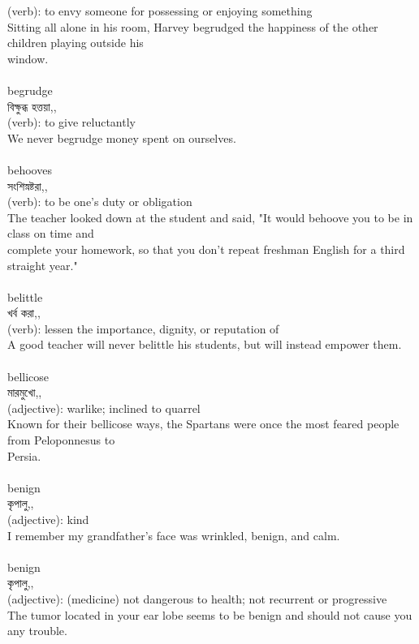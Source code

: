 \documentclass{article}
\begin{document}
{(verb): to envy someone for possessing or enjoying something\\Sitting all alone in his room, Harvey begrudged the happiness of the other children playing outside his\\window.\\}\\
{begrudge}\\
{বিক্ষুব্ধ হত্তয়া,,}\\
{(verb): to give reluctantly\\We never begrudge money spent on ourselves.\\}\\
{behooves}\\
{সংশিস্নষ্টরা,,}\\
{(verb): to be one's duty or obligation\\The teacher looked down at the student and said, "It would behoove you to be in class on time and\\complete your homework, so that you don't repeat freshman English for a third straight year."\\}\\
{belittle}\\
{খর্ব করা,,}\\
{(verb): lessen the importance, dignity, or reputation of\\A good teacher will never belittle his students, but will instead empower them.\\}\\
{bellicose}\\
{মারমুখো,,}\\
{(adjective): warlike; inclined to quarrel\\Known for their bellicose ways, the Spartans were once the most feared people from Peloponnesus to\\Persia.\\}\\
{benign}\\
{কৃপালু,,}\\
{(adjective): kind\\I remember my grandfather's face was wrinkled, benign, and calm.\\}\\
{benign}\\
{কৃপালু,,}\\
{(adjective): (medicine) not dangerous to health; not recurrent or progressive\\The tumor located in your ear lobe seems to be benign and should not cause you any trouble.\\}\\
\end{document}
